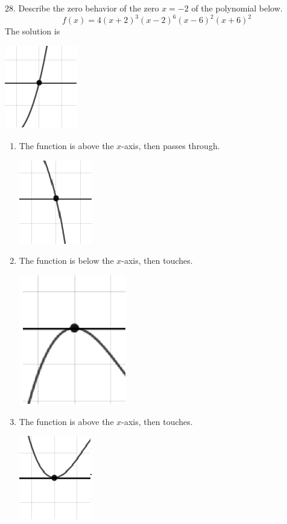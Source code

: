 \documentclass{article}[10pt]
\begin{document}
28. Describe the zero behavior of the zero $x = -2$ of the polynomial below.
$$ f(x) = 4(x + 2)^{3}(x - 2)^{6}(x - 6)^{2}(x + 6)^{2} $$ 
The solution is  
\begin{center}\includegraphics[scale=0.5]{../Figures/zeroBehaviorPositiveOdd.png}\end{center}\begin{enumerate}[label=\Alph*.] 
\item The function is above the $x$-axis, then passes through. 
\begin{center}\includegraphics[scale=0.5]{../Figures/zeroBehaviorNegativeOdd.png}\end{center} 
 
\item The function is below the $x$-axis, then touches. 
\begin{center}\includegraphics[scale=0.5]{../Figures/zeroBehaviorNegativeEven.png}\end{center} 
 
\item The function is above the $x$-axis, then touches. 
\begin{center}\includegraphics[scale=0.5]{../Figures/zeroBehaviorPositiveEven.png}\end{center} 
 

\end{enumerate}
\end{document}
